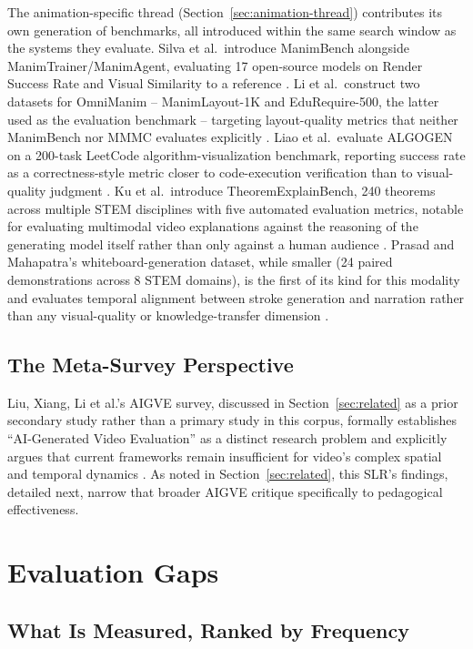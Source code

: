 \documentclass[journal]{IEEEtran}
\begin{document}
The animation-specific thread (Section~\ref{sec:animation-thread}) contributes its own generation of benchmarks, all introduced within the same search window as the systems they evaluate. Silva et al.\ introduce ManimBench alongside ManimTrainer/ManimAgent, evaluating 17 open-source models on Render Success Rate and Visual Similarity to a reference \cite{silva2026manimtrainer}. Li et al.\ construct two datasets for OmniManim -- ManimLayout-1K and EduRequire-500, the latter used as the evaluation benchmark -- targeting layout-quality metrics that neither ManimBench nor MMMC evaluates explicitly \cite{li2026omnimanim}. Liao et al.\ evaluate ALGOGEN on a 200-task LeetCode algorithm-visualization benchmark, reporting success rate as a correctness-style metric closer to code-execution verification than to visual-quality judgment \cite{liao2026algogen}. Ku et al.\ introduce TheoremExplainBench, 240 theorems across multiple STEM disciplines with five automated evaluation metrics, notable for evaluating multimodal video explanations against the reasoning of the generating model itself rather than only against a human audience \cite{ku2025theoremexplainagent}. Prasad and Mahapatra's whiteboard-generation dataset, while smaller (24 paired demonstrations across 8 STEM domains), is the first of its kind for this modality and evaluates temporal alignment between stroke generation and narration rather than any visual-quality or knowledge-transfer dimension \cite{prasad2026whiteboard}.

\subsection{The Meta-Survey Perspective}

Liu, Xiang, Li et al.'s AIGVE survey, discussed in Section~\ref{sec:related} as a prior secondary study rather than a primary study in this corpus, formally establishes ``AI-Generated Video Evaluation'' as a distinct research problem and explicitly argues that current frameworks remain insufficient for video's complex spatial and temporal dynamics \cite{liu2024aigve}. As noted in Section~\ref{sec:related}, this SLR's findings, detailed next, narrow that broader AIGVE critique specifically to pedagogical effectiveness.

\section{Evaluation Gaps}
\label{sec:gaps}

\subsection{What Is Measured, Ranked by Frequency}
\end{document}
